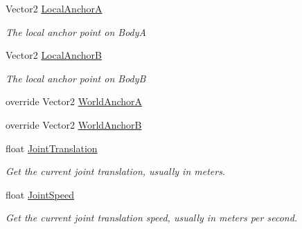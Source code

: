 \begin{DoxyCompactItemize}
\item 
Vector2 \hyperlink{class_farseer_physics_1_1_dynamics_1_1_joints_1_1_prismatic_joint_af58c97ee02474eb8b0ce2b1dbabf9910}{Local\+Anchor\+A}
\begin{DoxyCompactList}\small\item\em The local anchor point on Body\+A \end{DoxyCompactList}\item 
Vector2 \hyperlink{class_farseer_physics_1_1_dynamics_1_1_joints_1_1_prismatic_joint_a47991446da4f0c9d96fd5e989d3e1286}{Local\+Anchor\+B}
\begin{DoxyCompactList}\small\item\em The local anchor point on Body\+B \end{DoxyCompactList}\item 
override Vector2 \hyperlink{class_farseer_physics_1_1_dynamics_1_1_joints_1_1_prismatic_joint_a7e94a730d582ca7fc50c453b683000fb}{World\+Anchor\+A}
\item 
override Vector2 \hyperlink{class_farseer_physics_1_1_dynamics_1_1_joints_1_1_prismatic_joint_ac4c9e37aaca70be7d56acd3e33477ad4}{World\+Anchor\+B}
\item 
float \hyperlink{class_farseer_physics_1_1_dynamics_1_1_joints_1_1_prismatic_joint_a90c57e0f17039ca3a867d7f7aa0fe765}{Joint\+Translation}
\begin{DoxyCompactList}\small\item\em Get the current joint translation, usually in meters. \end{DoxyCompactList}\item 
float \hyperlink{class_farseer_physics_1_1_dynamics_1_1_joints_1_1_prismatic_joint_a68073910800636bdab7001343e76501c}{Joint\+Speed}
\begin{DoxyCompactList}\small\item\em Get the current joint translation speed, usually in meters per second. \end{DoxyCompactList}\item 

\end{DoxyCompactItemize}
